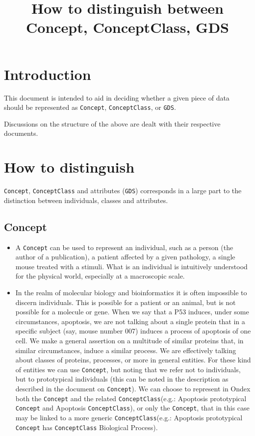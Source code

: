 \documentclass[a4paper,10pt]{article}
\title{How to distinguish between Concept, ConceptClass, GDS}
\newcommand{\term}[1]{\texttt{#1}\xspace}
\newcommand{\cc}{\term{ConceptClass}}
\newcommand{\co}{\term{Concept}}
\newcommand{\gds}{\term{GDS}}
\begin{document}
\maketitle

\section{Introduction}
This document is intended to aid in deciding whether a given piece of data should be represented as \co, \cc, or \gds.

Discussions on the structure of the above are dealt with their respective documents.

\section{How to distinguish}
\co, \cc and attributes (\gds) corresponds in a large part to the distinction between individuals, classes and attributes. 
\subsection{Concept}
\begin{itemize}
\item A \co can be used to represent an individual, such as a person (the author of a publication), a patient affected by a given pathology, a single mouse treated with a stimuli. What is an individual is intuitively understood for the physical world, especially at a macroscopic scale.
\item In the realm of molecular biology and bioinformatics it is often impossible to discern individuals. This is possible for a patient or an animal, but is not possible for a molecule or gene. When we say that a P53 induces, under some circumstances, apoptosis, we are not talking about a single protein that in a specific subject (say, mouse number 007) induces a process of apoptosis of one cell. We make a general assertion on a multitude of similar proteins that, in similar circumstances, induce a similar process.
We are effectively talking about classes of proteins, processes, or more in general entities.
For these kind of entities we can use \co, but noting that we refer not to individuals, but to prototypical individuals (this can be noted in the description as described in the document on \co).
We can choose to represent in Ondex both the \co and the related  \cc (e.g.: Apoptosis prototypical \co and Apoptosis \cc), or only the \co, that in this case may be linked to a more generic \cc (e.g.: Apoptosis prototypical \co has \cc Biological Process).
\end{itemize}
\end{document}

